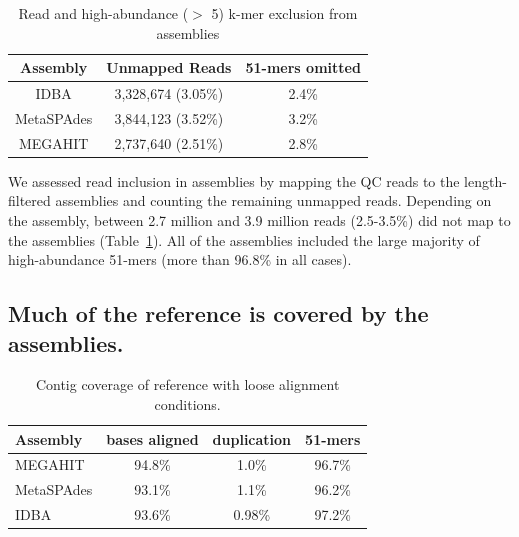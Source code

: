 \documentclass[11pt]{article}
\begin{document}

\begin{table}[!h]
\centering
\caption{Read and high-abundance ($>$ 5) k-mer exclusion from assemblies}
\begin{tabular}{|c|c|c|}\hline
  \textbf{Assembly} & \textbf{Unmapped Reads} & \textbf {51-mers omitted}
  \\ \hline
IDBA &3,328,674 (3.05\%)&  2.4\% \\ \hline
MetaSPAdes &3,844,123 (3.52\%) &  3.2\% \\ \hline
MEGAHIT &2,737,640 (2.51\%) &   2.8\% \\ \hline
\end{tabular}
\label{table:reads-kmers}
\end{table}

We assessed read inclusion in assemblies by mapping the QC reads to
the length-filtered assemblies and counting the remaining unmapped
reads. Depending on the assembly, between 2.7 million and 3.9 million
reads (2.5-3.5\%) did not map to the assemblies
(Table~\ref{table:reads-kmers}).  All of the assemblies included the large
majority of high-abundance 51-mers (more than 96.8\% in all cases).

\subsection*{Much of the reference is covered by the assemblies.}






\begin{table}[!h]
\centering
\caption{Contig coverage of reference with loose alignment conditions.}
\begin{tabular}{|l|c|c|c|}\hline
  \textbf{Assembly} & \textbf{bases aligned} & \textbf{duplication}
  & \textbf{51-mers}
  \\ \hline
MEGAHIT & 94.8\% & 1.0\% & 96.7\% \\ \hline
MetaSPAdes  & 93.1\% & 1.1\% & 96.2\% \\ \hline
IDBA    & 93.6\% & 0.98\% & 97.2\% \\ \hline
\end{tabular}
\label{table:contig-coverage}
\end{table}
\end{document}
